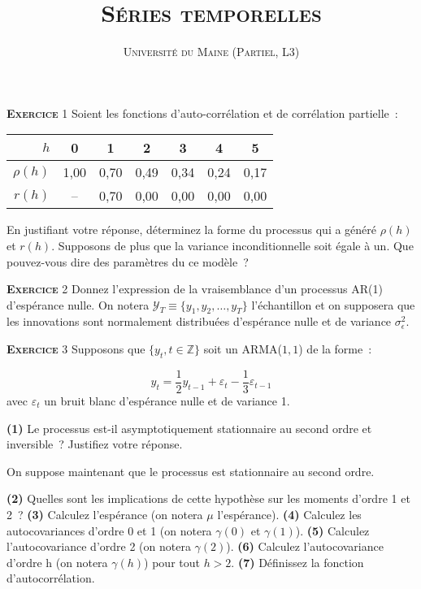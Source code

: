 \documentclass[10pt,a4paper,notitlepage,onecolumn]{article}
\newcommand{\exercice}[1]{\textsc{\textbf{Exercice}} #1}
\newcommand{\question}[1]{\textbf{(#1)}}
\begin{document}
\title{\textsc{Séries temporelles}}
\author{\textsc{Université du Maine (Partiel, L3)}}
\date{}


\maketitle

\exercice{1} Soient les fonctions d'auto-corrélation et de corrélation
partielle :
\begin{table}[H]
  \centering
    \begin{tabular}{r|cccccc}
      \hline\hline
      $h$ & 0 & 1 & 2 & 3 & 4 & 5 \\\hline
      \hline\hline
      $\rho(h)$ & 1,00 & 0,70 & 0,49 & 0,34 & 0,24 & 0,17\\
      $r(h)$ & -- & 0,70 & 0,00 & 0,00 & 0,00 & 0,00\\
      \hline
    \end{tabular}
\end{table}

\noindent En justifiant votre réponse, déterminez la forme du
processus qui a généré $\rho(h)$ et $r(h)$. Supposons de plus que la
variance inconditionnelle soit égale à un. Que pouvez-vous dire des
paramètres du ce modèle ?

\bigskip
\bigskip


\exercice{2}  Donnez l'expression de la vraisemblance d'un processus
AR(1) d'espérance nulle. On notera $\mathcal Y_T \equiv \{y_1,y_2,\dots,y_T\}$
l'échantillon et on supposera que les innovations sont normalement
distribuées d'espérance nulle et de variance $\sigma_{\epsilon}^2$.

\bigskip
\bigskip

\exercice{3} Supposons que $\{y_t,t\in\mathbb Z\}$ soit un ARMA($1,1$) de la forme :

\[
y_t = \frac{1}{2}y_{t-1} + \varepsilon_t - \frac{1}{3} \varepsilon_{t-1}
\]
avec $\varepsilon_t$ un bruit blanc d'espérance nulle et de variance 1.\newline

\question{1}   Le    processus   est-il   asymptotiquement
stationnaire  au   second  ordre   et  inversible ?   Justifiez  votre
réponse.\newline

On suppose maintenant que le processus est stationnaire au second
ordre.\newline

\question{2} Quelles sont les implications de cette hypothèse sur les
moments d'ordre 1 et 2 ? \question{3} Calculez l'espérance (on notera
$\mu$ l'espérance). \question{4} Calculez les autocovariances d'ordre
0 et 1 (on notera $\gamma(0)$ et $\gamma(1)$). \question{5} Calculez
l'autocovariance d'ordre 2 (on notera $\gamma(2)$). \question{6}
Calculez l'autocovariance d'ordre h (on notera $\gamma(h)$) pour tout
$h>2$.  \question{7} Définissez la fonction d'autocorrélation.
\end{document}
